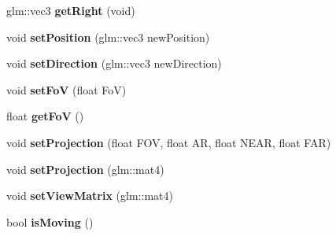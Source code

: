 \begin{DoxyCompactItemize}
\item 
glm\+::vec3 {\bfseries get\+Right} (void)\hypertarget{class_camera_aa4797845d8c2179a0ad9d47a32e1abd5}{}\label{class_camera_aa4797845d8c2179a0ad9d47a32e1abd5}

\item 
void {\bfseries set\+Position} (glm\+::vec3 new\+Position)\hypertarget{class_camera_aac2d0a2bd337c4523d38aefbdaeb8d41}{}\label{class_camera_aac2d0a2bd337c4523d38aefbdaeb8d41}

\item 
void {\bfseries set\+Direction} (glm\+::vec3 new\+Direction)\hypertarget{class_camera_ae871e4e4e8903f77897fdcb911a3642e}{}\label{class_camera_ae871e4e4e8903f77897fdcb911a3642e}

\item 
void {\bfseries set\+FoV} (float FoV)\hypertarget{class_camera_ade678831d00089b370b08e71c81f5215}{}\label{class_camera_ade678831d00089b370b08e71c81f5215}

\item 
float {\bfseries get\+FoV} ()\hypertarget{class_camera_aef7933e312710e4ed87329dbabb15a99}{}\label{class_camera_aef7933e312710e4ed87329dbabb15a99}

\item 
void {\bfseries set\+Projection} (float F\+OV, float AR, float N\+E\+AR, float F\+AR)\hypertarget{class_camera_a1956749dfc92f5b9c75bcff120e8ab5a}{}\label{class_camera_a1956749dfc92f5b9c75bcff120e8ab5a}

\item 
void {\bfseries set\+Projection} (glm\+::mat4)\hypertarget{class_camera_aa1606d668b24df804e1e4358040caa7f}{}\label{class_camera_aa1606d668b24df804e1e4358040caa7f}

\item 
void {\bfseries set\+View\+Matrix} (glm\+::mat4)\hypertarget{class_camera_abb039add28392d053bbc0759afee84f7}{}\label{class_camera_abb039add28392d053bbc0759afee84f7}

\item 
bool {\bfseries is\+Moving} ()\hypertarget{class_camera_ae5e581022eba09a62f7e8dde90dd17b0}{}\label{class_camera_ae5e581022eba09a62f7e8dde90dd17b0}

\end{DoxyCompactItemize}
